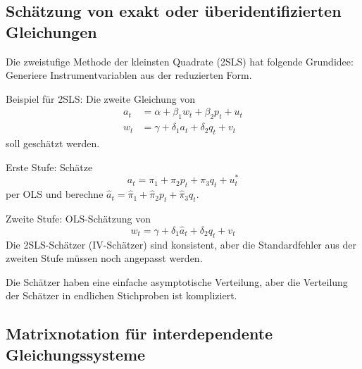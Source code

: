 \documentclass{article}
\begin{document}
\subsection*{Schätzung von exakt oder überidentifizierten Gleichungen}

Die zweistufige Methode der kleinsten Quadrate (2SLS) hat folgende
Grundidee: Generiere Instrumentvariablen aus der reduzierten Form.

Beispiel für 2SLS: Die zweite Gleichung von
\begin{align*}
a_{t} &=\alpha +\beta _{1}w_{t}+\beta _{2}p_{t}+u_{t} \\
w_{t} &=\gamma +\delta _{1}a_{t}+\delta _{2}q_{t}+v_{t}
\end{align*}
soll geschätzt werden.

Erste Stufe: Schätze
\[ a_{t}=\pi _{1}+\pi _{2}p_{t}+\pi _{3}q_{t}+u_{t}^{\ast } \]
per OLS und berechne $\hat{a}_{t}=\hat{\pi}_{1}+\hat{\pi}_{2}p_{t}+\hat{\pi}_{3}q_{t}$.

Zweite Stufe: OLS-Schätzung von
\[ w_{t}=\gamma +\delta _{1}\hat{a}_{t}+\delta _{2}q_{t}+v_{t} \]
Die 2SLS-Schätzer (IV-Schätzer) sind konsistent, aber die Standardfehler aus der
zweiten Stufe müssen noch angepasst werden.

Die Schätzer haben eine einfache asymptotische Verteilung, aber die
Verteilung der Schätzer in endlichen Stichproben ist kompliziert.

\subsection*{Matrixnotation für interdependente Gleichungssysteme}
\end{document}
